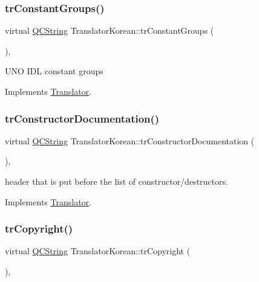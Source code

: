 \subsubsection{\texorpdfstring{trConstantGroups()}{trConstantGroups()}}
{\footnotesize\ttfamily virtual \mbox{\hyperlink{class_q_c_string}{Q\+C\+String}} Translator\+Korean\+::tr\+Constant\+Groups (\begin{DoxyParamCaption}{ }\end{DoxyParamCaption})\hspace{0.3cm}{\ttfamily [inline]}, {\ttfamily [virtual]}}

U\+NO I\+DL constant groups 

Implements \mbox{\hyperlink{class_translator}{Translator}}.

\mbox{\label{class_translator_korean_a2c6b9321fa2340af82c888da7aa29674}} 
\subsubsection{\texorpdfstring{trConstructorDocumentation()}{trConstructorDocumentation()}}
{\footnotesize\ttfamily virtual \mbox{\hyperlink{class_q_c_string}{Q\+C\+String}} Translator\+Korean\+::tr\+Constructor\+Documentation (\begin{DoxyParamCaption}{ }\end{DoxyParamCaption})\hspace{0.3cm}{\ttfamily [inline]}, {\ttfamily [virtual]}}

header that is put before the list of constructor/destructors. 

Implements \mbox{\hyperlink{class_translator}{Translator}}.

\mbox{\label{class_translator_korean_a911c8854c48591cc1471fd4f6c1133b9}} 
\subsubsection{\texorpdfstring{trCopyright()}{trCopyright()}}
{\footnotesize\ttfamily virtual \mbox{\hyperlink{class_q_c_string}{Q\+C\+String}} Translator\+Korean\+::tr\+Copyright (\begin{DoxyParamCaption}{ }\end{DoxyParamCaption})\hspace{0.3cm}{\ttfamily [inline]}, {\ttfamily [virtual]}}

